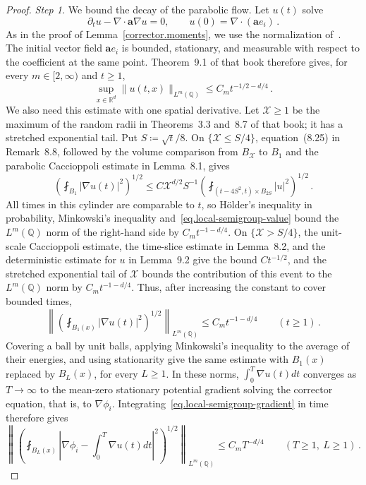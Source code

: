 \documentclass[11pt]{amsart}
\theoremstyle{definition}
\theoremstyle{remark}
\numberwithin{equation}{section}
\newcommand{\Q}{\mathbb Q}
\newcommand{\R}{\mathbb R}
\renewcommand{\a}{\mathbf a}
\begin{document}
\begin{proof}
\emph{Step 1.} We bound the decay of the parabolic flow. Let $u(t)$ solve
\begin{equation*}
 \partial_tu-\nabla\cdot\a\nabla u=0,
 \qquad u(0)=\nabla\cdot(\a e_i)\, .
\end{equation*}
As in the proof of Lemma~\ref{corrector.moments}, we use the normalization of~\citet{AKM2019book}. The initial vector field $\a e_i$ is bounded, stationary, and measurable with respect to the coefficient at the same point. Theorem~9.1 of that book therefore gives, for every $m\in[2,\infty)$ and $t\geq1$,
\begin{equation}\label{eq.local-semigroup-value}
 \sup_{x\in\R^d}\|u(t,x)\|_{L^m(\Q)}\leq C_mt^{-1/2-d/4}\, .
\end{equation}
We also need this estimate with one spatial derivative. Let $\mathcal X\geq1$ be the maximum of the random radii in Theorems~3.3 and~8.7 of that book; it has a stretched exponential tail. Put $S\coloneqq\sqrt t/8$. On $\{\mathcal X\leq S/4\}$, equation~(8.25) in Remark~8.8, followed by the volume comparison from $B_{\mathcal X}$ to $B_1$ and the parabolic Caccioppoli estimate in Lemma~8.1, gives
\begin{equation*}
 \left(\fint_{B_1}|\nabla u(t)|^2\right)^{1/2}
 \leq C\mathcal X^{d/2}S^{-1}
 \left(\fint_{(t-4S^2,t)\times B_{2S}}|u|^2\right)^{1/2}\, .
\end{equation*}
All times in this cylinder are comparable to $t$, so H\"older's inequality in probability, Minkowski's inequality and~\eqref{eq.local-semigroup-value} bound the $L^m(\Q)$ norm of the right-hand side by $C_mt^{-1-d/4}$. On $\{\mathcal X>S/4\}$, the unit-scale Caccioppoli estimate, the time-slice estimate in Lemma~8.2, and the deterministic estimate for $u$ in Lemma~9.2 give the bound $Ct^{-1/2}$, and the stretched exponential tail of $\mathcal X$ bounds the contribution of this event to the $L^m(\Q)$ norm by $C_mt^{-1-d/4}$. Thus, after increasing the constant to cover bounded times,
\begin{equation}\label{eq.local-semigroup-gradient}
 \left\|\left(\fint_{B_1(x)}|\nabla u(t)|^2\right)^{1/2}\right\|_{L^m(\Q)}
 \leq C_mt^{-1-d/4}
 \qquad(t\geq1)\, .
\end{equation}
Covering a ball by unit balls, applying Minkowski's inequality to the average of their energies, and using stationarity give the same estimate with $B_1(x)$ replaced by $B_L(x)$, for every $L\geq1$. In these norms, $\int_0^T\nabla u(t)dt$ converges as $T\to\infty$ to the mean-zero stationary potential gradient solving the corrector equation, that is, to $\nabla\phi_i$. Integrating~\eqref{eq.local-semigroup-gradient} in time therefore gives
\begin{equation}\label{eq.local-corrector-tail}
 \left\|\left(\fint_{B_L(x)}\left|\nabla\phi_i-\int_0^T\nabla u(t)dt\right|^2\right)^{1/2}\right\|_{L^m(\Q)}
 \leq C_mT^{-d/4}
 \qquad(T\geq1,\ L\geq1)\, .
\end{equation}


\end{proof}
\end{document}
